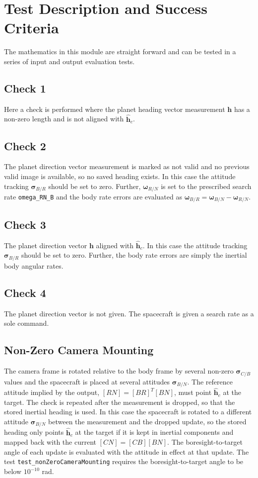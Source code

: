 
\section{Test Description and Success Criteria}
The mathematics in this module are straight forward and can be tested in a series of input and output evaluation tests.


\subsection{Check 1}
Here a check is performed where the planet heading vector measurement $\bm h$ has a non-zero length and is not aligned with $\hat{\bm h}_{c}$.

\subsection{Check 2}
The planet direction vector measurement is marked as not valid and no previous valid image is available, so no saved heading exists.  In this case the attitude tracking $\bm\sigma_{B/R}$ should be set to zero.  Further, $\bm\omega_{R/N}$ is set to the prescribed search rate {\tt omega\_RN\_B} and the body rate errors are evaluated as $\bm\omega_{B/R} = \bm\omega_{B/N} - \bm\omega_{R/N}$.

\subsection{Check 3}
The planet direction vector $\bm h$ aligned with $\hat{\bm h}_{c}$.  In this case the attitude tracking $\bm\sigma_{B/R}$ should be set to zero.  Further, the body rate errors are simply the inertial body angular rates.

\subsection{Check 4}
The planet direction vector is not given. The spacecraft is given a search rate as a sole command.

\subsection{Non-Zero Camera Mounting}
The camera frame is rotated relative to the body frame by several non-zero $\bm\sigma_{C/B}$ values and the spacecraft is placed at several attitudes $\bm\sigma_{B/N}$.  The reference attitude implied by the output, $[RN] = [BR]^{T}[BN]$, must point $\hat{\bm h}_{c}$ at the target.  The check is repeated after the measurement is dropped, so that the stored inertial heading is used.  In this case the spacecraft is rotated to a different attitude $\bm\sigma_{B/N}$ between the measurement and the dropped update, so the stored heading only points $\hat{\bm h}_{c}$ at the target if it is kept in inertial components and mapped back with the current $[CN] = [CB][BN]$.  The boresight-to-target angle of each update is evaluated with the attitude in effect at that update.  The test {\tt test\_nonZeroCameraMounting} requires the boresight-to-target angle to be below $10^{-10}$ rad.

